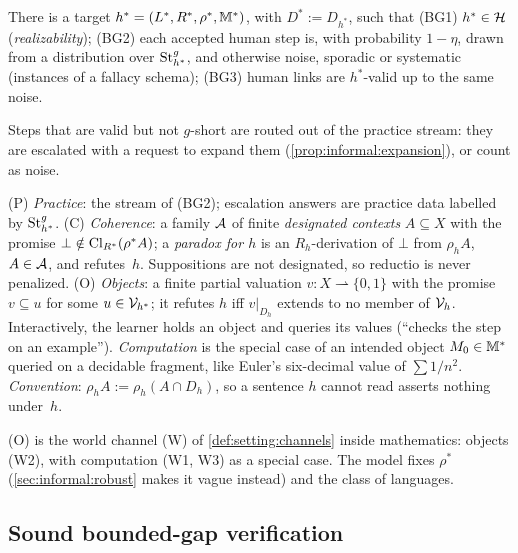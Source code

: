 \begin{assumption}\label{asm:informal:BG}
There is a target $h^*=(L^*,R^{*},\rho^*,\mathbb M^*)$, with $D^*:=D_{h^*}$, such that (BG1) $h^*\in\mathcal{H}$ (\emph{realizability}); (BG2) each accepted human step is, with probability $1-\eta$, drawn from a distribution over $\mathrm{St}^{g}_{h^*}$, and otherwise noise, sporadic or systematic (instances of a fallacy schema); (BG3) human links are $h^*$-valid up to the same noise.
\end{assumption}

Steps that are valid but not $g$-short are routed out of the practice stream: they are escalated with a request to expand them (\cref{prop:informal:expansion}), or count as noise.

\begin{definition}\label{def:informal:channels}
(P) \emph{Practice}: the stream of (BG2); escalation answers are practice data labelled by $\mathrm{St}^{g}_{h^*}$. (C) \emph{Coherence}: a family $\mathcal{A}$ of finite \emph{designated contexts} $A\subseteq X$ with the promise $\bot\notin\mathrm{Cl}_{R^{*}}(\rho^*A)$; a \emph{paradox for $h$} is an $R_h$-derivation of $\bot$ from $\rho_hA$, $A\in\mathcal{A}$, and refutes~$h$. Suppositions are not designated, so reductio is never penalized. (O) \emph{Objects}: a finite partial valuation $v:X\rightharpoonup\{0,1\}$ with the promise $v\subseteq u$ for some $u\in\mathcal V_{h^*}$; it refutes $h$ iff $v|_{D_h}$ extends to no member of $\mathcal V_{h}$. Interactively, the learner holds an object and queries its values (``checks the step on an example''). \emph{Computation} is the special case of an intended object $M_0\in\mathbb M^*$ queried on a decidable fragment, like Euler's six-decimal value of $\sum1/n^2$. \emph{Convention}: $\rho_hA:=\rho_h(A\cap D_h)$, so a sentence $h$ cannot read asserts nothing under~$h$.
\end{definition}

(O) is the world channel (W) of \cref{def:setting:channels} inside mathematics: objects (W2), with computation (W1, W3) as a special case. The model fixes $\rho^*$ (\cref{sec:informal:robust} makes it vague instead) and the class of languages.

\subsection{Sound bounded-gap verification}\label{sec:informal:verify}

